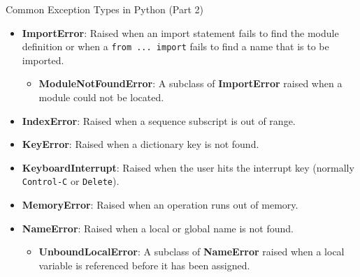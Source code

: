 \begin{frame}{Common Exception Types in Python (Part 2)}
    \begin{itemize}
        \item \textbf{ImportError}: Raised when an import statement fails to find the module definition or when a \texttt{from ... import} fails to find a name that is to be imported.
            \begin{itemize}
                \item \textbf{ModuleNotFoundError}: A subclass of \textbf{ImportError} raised when a module could not be located.
            \end{itemize}
        \item \textbf{IndexError}: Raised when a sequence subscript is out of range.
        \item \textbf{KeyError}: Raised when a dictionary key is not found.
        \item \textbf{KeyboardInterrupt}: Raised when the user hits the interrupt key (normally \texttt{Control-C} or \texttt{Delete}).
        \item \textbf{MemoryError}: Raised when an operation runs out of memory.
        \item \textbf{NameError}: Raised when a local or global name is not found.
            \begin{itemize}
                \item \textbf{UnboundLocalError}: A subclass of \textbf{NameError} raised when a local variable is referenced before it has been assigned.
            \end{itemize}
    \end{itemize}
\end{frame}

